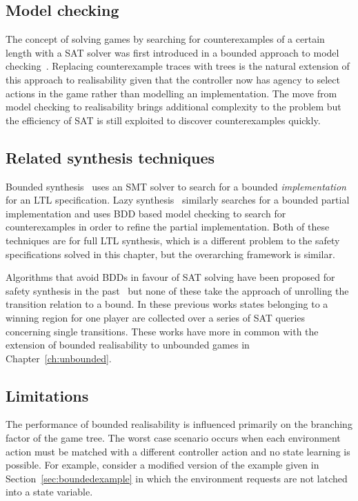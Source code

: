 \subsection{Model checking}

The concept of solving games by searching for counterexamples of a certain length with a SAT solver was first introduced in a bounded approach to model checking~\cite{Biere99}. Replacing counterexample traces with trees is the natural extension of this approach to realisability given that the controller now has agency to select actions in the game rather than modelling an implementation. The move from model checking to realisability brings additional complexity to the problem but the efficiency of SAT is still exploited to discover counterexamples quickly.

\subsection{Related synthesis techniques}

Bounded synthesis~\cite{Finkbeiner13} uses an SMT solver to search for a bounded \emph{implementation} for an LTL specification. Lazy synthesis~\cite{Finkbeiner12} similarly searches for a bounded partial implementation and uses BDD based model checking to search for counterexamples in order to refine the partial implementation. Both of these techniques are for full LTL synthesis, which is a different problem to the safety specifications solved in this chapter, but the overarching framework is similar. 

Algorithms that avoid BDDs in favour of SAT solving have been proposed for safety synthesis in the past~\cite{Morgenstern13,Chiang15,Bloem14} but none of these take the approach of unrolling the transition relation to a bound. In these previous works states belonging to a winning region for one player are collected over a series of SAT queries concerning single transitions. These works have more in common with the extension of bounded realisability to unbounded games in Chapter~\ref{ch:unbounded}.

\subsection{Limitations}

The performance of bounded realisability is influenced primarily on the branching factor of the game tree. The worst case scenario occurs when each environment action must be matched with a different controller action and no state learning is possible. For example, consider a modified version of the example given in Section~\ref{sec:boundedexample} in which the environment requests are not latched into a state variable.

